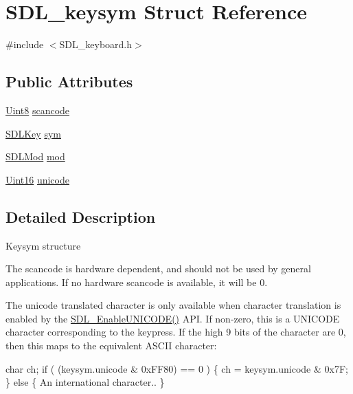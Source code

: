 \hypertarget{struct_s_d_l__keysym}{}\section{S\+D\+L\+\_\+keysym Struct Reference}
\label{struct_s_d_l__keysym}


{\ttfamily \#include $<$S\+D\+L\+\_\+keyboard.\+h$>$}

\subsection*{Public Attributes}
\begin{DoxyCompactItemize}
\item 
\hyperlink{_s_d_l__stdinc_8h_a2944638813a090aa23e62f4da842c3e2}{Uint8} \hyperlink{struct_s_d_l__keysym_a1ea71b1de132939909302dc14e5f468c}{scancode}
\item 
\hyperlink{_s_d_l__keysym_8h_ab8a13abddfa48bf4201973c2aa0afc1a}{S\+D\+L\+Key} \hyperlink{struct_s_d_l__keysym_a2a22c7afc8239b19cd18dda3aa26b70c}{sym}
\item 
\hyperlink{_s_d_l__keysym_8h_afe84f290b2bed7ad120fb899fa8513cf}{S\+D\+L\+Mod} \hyperlink{struct_s_d_l__keysym_ac5da46a4cf8aea69b0b1cb3f9224c91c}{mod}
\item 
\hyperlink{_s_d_l__stdinc_8h_a31fcc0a076c9068668173ee26d33e42b}{Uint16} \hyperlink{struct_s_d_l__keysym_a683a8e5de4e6dc6de95f670f6275cb0c}{unicode}
\end{DoxyCompactItemize}


\subsection{Detailed Description}
Keysym structure


\begin{DoxyItemize}
\item The scancode is hardware dependent, and should not be used by general applications. If no hardware scancode is available, it will be 0.
\item The \textquotesingle{}unicode\textquotesingle{} translated character is only available when character translation is enabled by the \hyperlink{_s_d_l__keyboard_8h_aa872f99acb3dd68cdd806e2421ff8e96}{S\+D\+L\+\_\+\+Enable\+U\+N\+I\+C\+O\+D\+E()} A\+P\+I. If non-\/zero, this is a U\+N\+I\+C\+O\+D\+E character corresponding to the keypress. If the high 9 bits of the character are 0, then this maps to the equivalent A\+S\+C\+I\+I character\+: 
\begin{DoxyCode}
\textcolor{keywordtype}{char} ch;
\textcolor{keywordflow}{if} ( (keysym.unicode & 0xFF80) == 0 ) \{
    ch = keysym.unicode & 0x7F;
\} \textcolor{keywordflow}{else} \{
    An international character..
\}
\end{DoxyCode}
 
\end{DoxyItemize}

